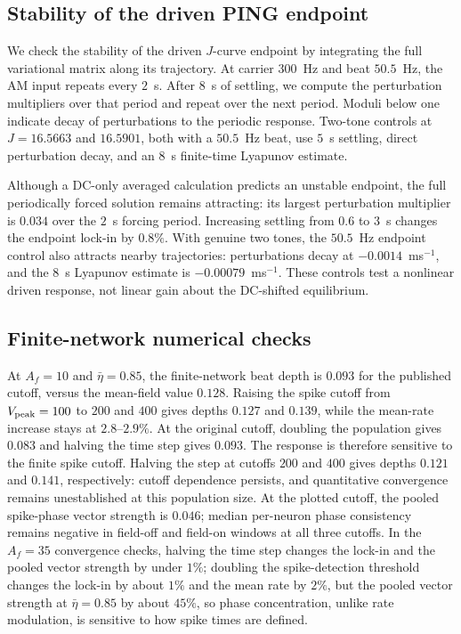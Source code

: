 \documentclass[11pt,a4paper]{article}
\begin{document}
\fi

\subsection{Stability of the driven PING endpoint}\label{app:ping-stability}
We check the stability of the driven $J$-curve endpoint by integrating the full
variational matrix along its trajectory. At carrier $300$~Hz and beat $50.5$~Hz,
the AM input repeats every $2$~s. After $8$~s of settling, we compute the
perturbation multipliers over that period and repeat over the next period.
Moduli below one indicate decay of perturbations to the periodic response.
Two-tone controls at $J=16.5663$ and $16.5901$, both with a $50.5$~Hz beat,
use $5$~s settling, direct perturbation decay, and an $8$~s finite-time
Lyapunov estimate.

Although a DC-only averaged calculation predicts an unstable endpoint, the full
periodically forced solution remains attracting: its largest perturbation
multiplier is $0.034$ over the $2$~s forcing period. Increasing settling from
$0.6$ to $3$~s changes the endpoint lock-in by $0.8\%$. With genuine two tones,
the $50.5$~Hz endpoint control also attracts nearby trajectories: perturbations
decay at $-0.0014$~ms$^{-1}$, and the $8$~s Lyapunov estimate is
$-0.00079$~ms$^{-1}$. These controls test a nonlinear driven response, not linear
gain about the DC-shifted equilibrium.

\subsection{Finite-network numerical checks}\label{app:qif-checks}
At $A_f=10$ and $\bar\eta=0.85$, the finite-network beat depth is $0.093$
for the published cutoff, versus the mean-field value $0.128$. Raising the spike cutoff from $V_{\rm peak}=100$ to
$200$ and $400$ gives depths $0.127$ and $0.139$, while the mean-rate increase
stays at $2.8$--$2.9\%$. At the original cutoff, doubling the population gives
$0.083$ and halving the time step gives $0.093$. The response is therefore
sensitive to the finite spike cutoff. Halving the step at cutoffs $200$ and
$400$ gives depths $0.121$ and $0.141$, respectively: cutoff dependence persists,
and quantitative convergence remains unestablished at this population size.
At the plotted cutoff, the pooled spike-phase vector strength is $0.046$;
median per-neuron phase consistency remains negative in field-off and field-on
windows at all three cutoffs.
In the $A_f=35$ convergence checks, halving the time step changes the lock-in and the pooled vector
strength by under $1\%$; doubling the spike-detection threshold changes the lock-in by
about $1\%$ and the mean rate by $2\%$, but the pooled vector strength at
$\bar\eta=0.85$ by about $45\%$, so phase concentration, unlike rate modulation, is sensitive to
how spike times are defined.
\end{document}
